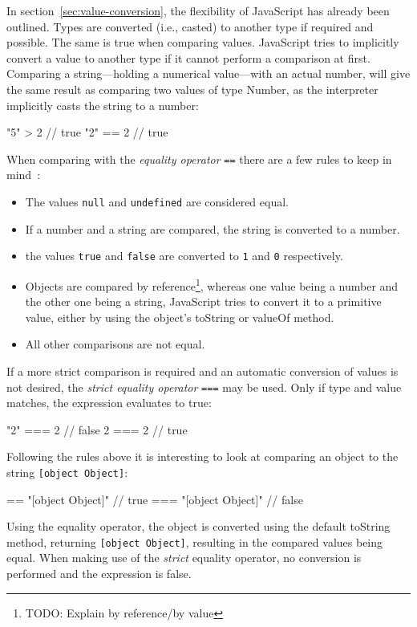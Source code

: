 In section~\ref{sec:value-conversion}, the flexibility of JavaScript has already been outlined. Types are converted (i.e., casted) to another type if required and possible.  The same is true when comparing values. JavaScript tries to implicitly convert a value to another type if it cannot perform a comparison at first. Comparing a string---holding a numerical value---with an actual number, will give the same result as comparing two values of type Number, as the interpreter implicitly casts the string to a number:
\begin{JsCode}[numbers=none]
"5" > 2 // true
"2" == 2 // true
\end{JsCode}
When comparing with the \emph{equality operator} \texttt{==} there are a few rules to keep in mind~\cite[~p.~72]{JavaScriptTheDefinitiveGuide:Flanagan:2011}:
\begin{itemize}
  \item The values \texttt{null} and \texttt{undefined} are considered equal.
  \item If a number and a string are compared, the string is converted to a number.
  \item the values \texttt{true} and \texttt{false} are converted to \texttt{1} and \texttt{0} respectively.
  \item Objects are compared by reference\footnote{TODO: Explain by reference/by value}, whereas one value being a number and the other one being a string, JavaScript tries to convert it to a primitive value, either by using the object's toString or valueOf method.
  \item All other comparisons are not equal.
\end{itemize}
If a more strict comparison is required and an automatic conversion of values is not desired, the \emph{strict equality operator} \texttt{===} may be used. Only if type and value matches, the expression evaluates to true:
\begin{JsCode}[numbers=none]
"2" === 2 // false
2 === 2   // true
\end{JsCode}
Following the rules above it is interesting to look at comparing an object to the string \texttt{[object Object]}:
\begin{JsCode}[numbers=none]
{} == "[object Object]"  // true
{} === "[object Object]" // false
\end{JsCode}
Using the equality operator, the object is converted using the default toString method, returning \texttt{[object Object]}, resulting in the compared values being equal. When making use of the \emph{strict} equality operator, no conversion is performed and the expression is false.

